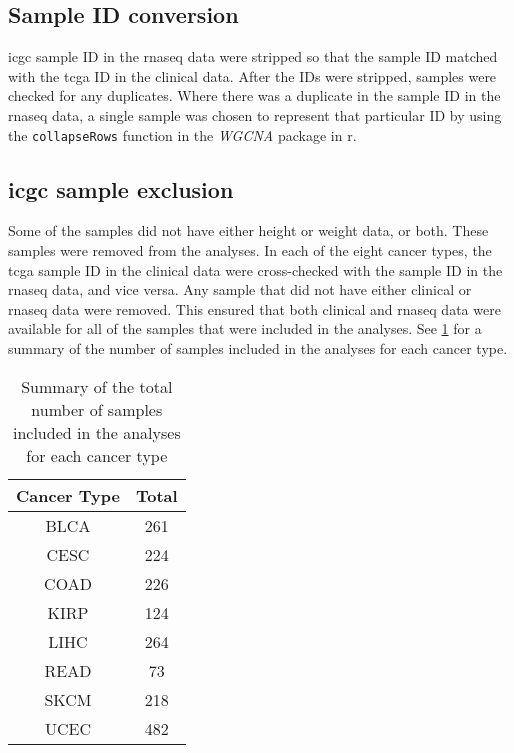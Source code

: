 \subsection{Sample ID conversion}
\label{sub:sample_id_conversion}

\gls{icgc} sample ID in the \gls{rnaseq} data were stripped so that the sample ID matched with the \gls{tcga} ID in the clinical data.
After the IDs were stripped, samples were checked for any duplicates.
Where there was a duplicate in the sample ID in the \gls{rnaseq} data, a single sample was chosen to represent that particular ID by using the \texttt{collapseRows} function in the \textit{WGCNA} package in \gls{r}.

\subsection{\gls{icgc} sample exclusion}
\label{sub:icgc_sample_exclusion}

Some of the samples did not have either height or weight data, or both.
These samples were removed from the analyses.
In each of the eight cancer types, the \gls{tcga} sample ID in the clinical data were cross-checked with the sample ID in the \gls{rnaseq} data, and vice versa.
Any sample that did not have either clinical or \gls{rnaseq} data were removed.
This ensured that both clinical and \gls{rnaseq} data were available for all of the samples that were included in the analyses.
See \cref{tab:samplesize} for a summary of the number of samples included in the analyses for each cancer type.

\begin{table}[h]
	\caption{Summary of the total number of samples included in the analyses for each cancer type}
	\label{tab:samplesize}
	\begin{center}
		\begin{tabular}{cc}
			\textbf{Cancer Type}   & \textbf{Total} \\
			\hline
			\rule{0pt}{2.25ex}BLCA & 261   \\
			CESC                   & 224   \\
			COAD                   & 226   \\
			KIRP                   & 124   \\
			LIHC                   & 264   \\
			READ                   & 73    \\
			SKCM                   & 218   \\
			UCEC                   & 482   \\
		\end{tabular}
	\end{center}
\end{table}

